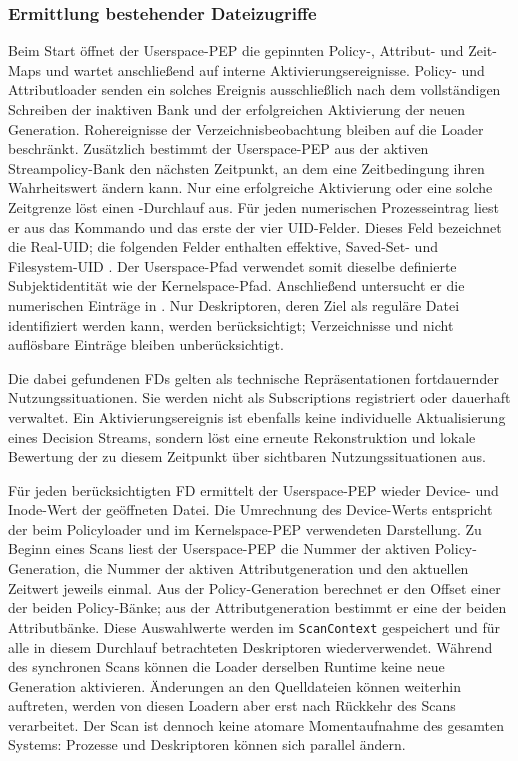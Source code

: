 \subsubsection{Ermittlung bestehender Dateizugriffe}
Beim Start öffnet der Userspace-PEP die gepinnten Policy-, Attribut- und Zeit-Maps und wartet anschließend auf interne Aktivierungsereignisse. Policy- und Attributloader senden ein solches Ereignis ausschließlich nach dem vollständigen Schreiben der inaktiven Bank und der erfolgreichen Aktivierung der neuen Generation. Rohereignisse der Verzeichnisbeobachtung bleiben auf die Loader beschränkt. Zusätzlich bestimmt der Userspace-PEP aus der aktiven Streampolicy-Bank den nächsten Zeitpunkt, an dem eine Zeitbedingung ihren Wahrheitswert ändern kann. Nur eine erfolgreiche Aktivierung oder eine solche Zeitgrenze löst einen -Durchlauf aus. Für jeden numerischen Prozesseintrag liest er aus  das Kommando und das erste der vier UID-Felder. Dieses Feld bezeichnet die Real-UID; die folgenden Felder enthalten effektive, Saved-Set- und Filesystem-UID \citep{manProcPidStatus}. Der Userspace-Pfad verwendet somit dieselbe definierte Subjektidentität wie der Kernelspace-Pfad. Anschließend untersucht er die numerischen Einträge in . Nur Deskriptoren, deren Ziel als reguläre Datei identifiziert werden kann, werden berücksichtigt; Verzeichnisse und nicht auflösbare Einträge bleiben unberücksichtigt.

Die dabei gefundenen FDs gelten als technische Repräsentationen fortdauernder Nutzungssituationen.
Sie werden nicht als Subscriptions registriert oder dauerhaft verwaltet.
Ein Aktivierungsereignis ist ebenfalls keine individuelle Aktualisierung eines Decision Streams, sondern löst eine erneute Rekonstruktion und lokale Bewertung der zu diesem Zeitpunkt über  sichtbaren Nutzungssituationen aus.

Für jeden berücksichtigten FD ermittelt der Userspace-PEP wieder Device- und Inode-Wert der geöffneten Datei. Die Umrechnung des Device-Werts entspricht der beim Policyloader und im Kernelspace-PEP verwendeten Darstellung. Zu Beginn eines Scans liest der Userspace-PEP die Nummer der aktiven Policy-Generation, die Nummer der aktiven Attributgeneration und den aktuellen Zeitwert jeweils einmal. Aus der Policy-Generation berechnet er den Offset einer der beiden Policy-Bänke; aus der Attributgeneration bestimmt er eine der beiden Attributbänke. Diese Auswahlwerte werden im \texttt{ScanContext} gespeichert und für alle in diesem Durchlauf betrachteten Deskriptoren wiederverwendet. Während des synchronen Scans können die Loader derselben Runtime keine neue Generation aktivieren. Änderungen an den Quelldateien können weiterhin auftreten, werden von diesen Loadern aber erst nach Rückkehr des Scans verarbeitet. Der Scan ist dennoch keine atomare Momentaufnahme des gesamten Systems: Prozesse und Deskriptoren können sich parallel ändern.

